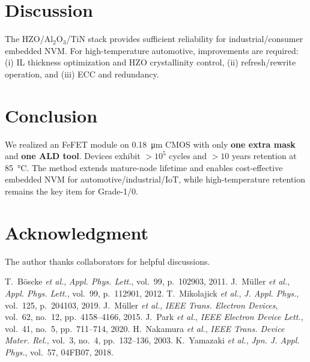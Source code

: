 \documentclass[conference]{IEEEtran}
\begin{document}
\section{Discussion}
The HZO/Al\(_2\)O\(_3\)/TiN stack provides sufficient reliability for industrial/consumer embedded NVM.  
For high-temperature automotive, improvements are required: (i) IL thickness optimization and HZO crystallinity control, (ii) refresh/rewrite operation, and (iii) ECC and redundancy.

\section{Conclusion}
We realized an FeFET module on \SI{0.18}{\micro m} CMOS with only \textbf{one extra mask} and \textbf{one ALD tool}. 
Devices exhibit \(>10^{5}\) cycles and \(>\!10\) years retention at \SI{85}{\celsius}. 
The method extends mature-node lifetime and enables cost-effective embedded NVM for automotive/industrial/IoT, while high-temperature retention remains the key item for Grade-1/0.

\section*{Acknowledgment}
The author thanks collaborators for helpful discussions.


\begin{thebibliography}{99}
 T.~B\"oscke \emph{et al.}, \emph{Appl. Phys. Lett.}, vol.~99, p.~102903, 2011.
 J.~M\"uller \emph{et al.}, \emph{Appl. Phys. Lett.}, vol.~99, p.~112901, 2012.
 T.~Mikolajick \emph{et al.}, \emph{J. Appl. Phys.}, vol.~125, p.~204103, 2019.
 J.~M\"uller \emph{et al.}, \emph{IEEE Trans. Electron Devices}, vol.~62, no.~12, pp.~4158--4166, 2015.
 J.~Park \emph{et al.}, \emph{IEEE Electron Device Lett.}, vol.~41, no.~5, pp.~711--714, 2020.
 H.~Nakamura \emph{et al.}, \emph{IEEE Trans. Device Mater. Rel.}, vol.~3, no.~4, pp.~132--136, 2003.
 K.~Yamazaki \emph{et al.}, \emph{Jpn. J. Appl. Phys.}, vol.~57, 04FB07, 2018.
\end{thebibliography}
\end{document}
